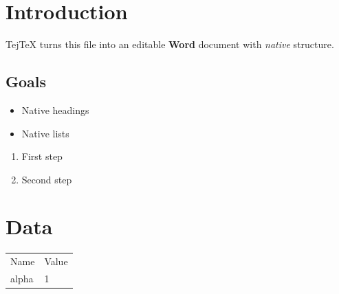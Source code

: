 \documentclass{article}
\begin{document}
\section{Introduction}
TejTeX turns this file into an editable \textbf{Word} document with \emph{native} structure.

\subsection{Goals}
\begin{itemize}
  \item Native headings
  \item Native lists
\end{itemize}

\begin{enumerate}
  \item First step
  \item Second step
\end{enumerate}

\section{Data}
\begin{tabular}{ll}
  Name & Value \\
  alpha & 1 \\
\end{tabular}
\end{document}
